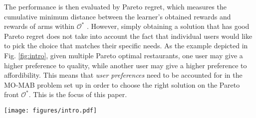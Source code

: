 The performance is then evaluated by Pareto regret, which measures the cumulative minimum distance between the learner's obtained rewards and rewards of arms within $\mathcal{O}^*$ \cite{drugan2013designing}. 
However, simply obtaining a solution that has good Pareto regret does not take into account the fact that individual users would like to pick the choice that matches their specific needs.
As the example depicted in Fig. \ref{fig:intro}, given multiple Pareto optimal restaurants, one user may give a higher preference to quality, while another user may give a higher preference to affordibility. This means that \emph{user preferences} need to be accounted for in the MO-MAB problem set up in order to choose the right solution on the Pareto front $\mathcal{O}^*$. This is the focus of this paper. 

\begin{figure*}[t]
    \centering    
    \texttt{[image: figures/intro.pdf]}
    \caption{
    A scenario of users interacting with a conversational recommender for restaurant recommendation. 
    (a) Recommender achieves Pareto optimality but receives low rating from user. 
    (b) Recommendations with high users' ratings when the recommender captures users' preferences and aligns optimization with preferences.
    }
    \label{fig:intro}
\end{figure*}

